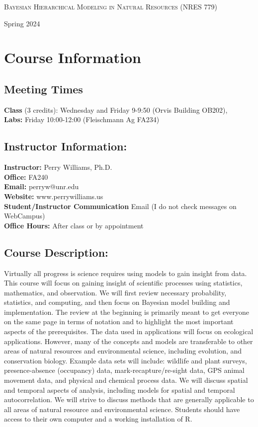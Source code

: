 \documentclass[11pt, a4paper]{article}
\begin{document}
\begin{center} {\Large \textsc{Bayesian Hierarchical Modeling in
      Natural Resources (NRES 779)}}
\end{center}
\begin{center}
  Spring 2024
\end{center}


\section*{Course Information}
\subsection*{Meeting Times}
\textbf{Class} (3 credits): Wednesday and  Friday 9-9:50 (Orvis Building OB202), \\
\textbf{Labs:} Friday 10:00-12:00 (Fleischmann Ag FA234)


\subsection*{Instructor Information:}
\textbf{Instructor:} Perry Williams, Ph.D. \\
\textbf{Office:} FA240\\
\textbf{Email:} perryw@unr.edu\\
\textbf{Website:} www.perrywilliams.us \\
\textbf{Student/Instructor Communication} Email (I do not check messages on WebCampus) \\
\textbf{Office Hours:} After class or by appointment


\subsection*{Course Description:}
Virtually all progress is science requires using models to gain
insight from data. This course will focus on gaining insight of
scientific processes using statistics, mathematics, and
observation. We will first review necessary probability, statistics,
and computing, and then focus on Bayesian model building and
implementation. The review at the beginning is primarily meant to get
everyone on the same page in terms of notation and to highlight the
most important aspects of the prerequisites. The data used in
applications will focus on ecological applications. However, many of
the concepts and models are transferable to other areas of natural
resources and environmental science, including evolution, and
conservation biology. Example data sets will include: wildlife and
plant surveys, presence-absence (occupancy) data,
mark-recapture/re-sight data, GPS animal movement data, and physical
and chemical process data. We will discuss spatial and temporal
aspects of analysis, including models for spatial and temporal
autocorrelation. We will strive to discuss methods that are generally
applicable to all areas of natural resource and environmental
science. Students should have access to their own computer and a
working installation of R.
\end{document}
